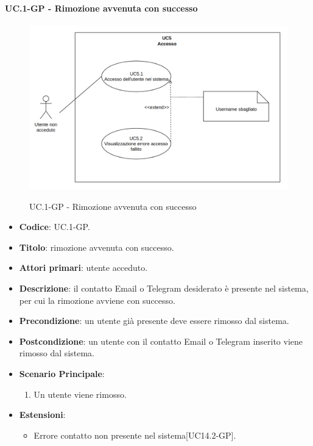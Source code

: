 	\paragraph{UC\theuccount.1-GP - Rimozione avvenuta con successo}
		\begin{figure}[H]
			\centering
			\includegraphics[width=\columnwidth]{img/UC5.png}\\
			\caption{UC\theuccount.1-GP - Rimozione avvenuta con successo}
		\end{figure}
		\begin{itemize}
			\item \textbf{Codice}: UC\theuccount.1-GP.
			\item \textbf{Titolo}: rimozione avvenuta con successo.
			\item \textbf{Attori primari}: utente acceduto.
			\item \textbf{Descrizione}: il contatto Email o Telegram desiderato è presente nel sistema,
			per cui la rimozione avviene con successo.
			\item \textbf{Precondizione}: un utente già presente deve essere rimosso dal sistema.
			\item \textbf{Postcondizione}: un utente con il contatto Email o Telegram inserito viene rimosso dal sistema.
			\item \textbf{Scenario Principale}:
			\begin{enumerate}
				\item Un utente viene rimosso.
			\end{enumerate}
			\item \textbf{Estensioni}:
			\begin{itemize}
				\item Errore contatto non presente nel sistema[UC14.2-GP].
			\end{itemize}
		\end{itemize}

